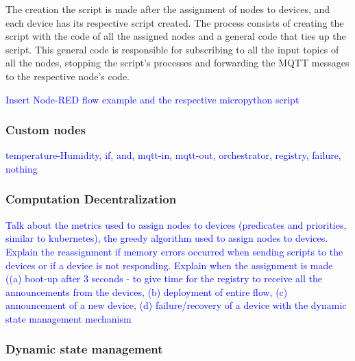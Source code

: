 The creation the script is made after the assignment of nodes to devices, and each device has its respective script created. The process consists of creating the script with the code of all the assigned nodes and a general code that ties up the script. This general code is responsible for subscribing to all the input topics of all the nodes, stopping the script's processes and forwarding the MQTT messages to the respective node's code.

\textcolor{blue}{Insert Node-RED flow example and the respective micropython script}

\subsubsection{Custom nodes}\label{sec:custom_nodes}

\textcolor{blue}{temperature-Humidity, if, and, mqtt-in, mqtt-out, orchestrator, registry, failure, nothing}

\subsubsection{Computation Decentralization}\label{sec:node_red_computation_decentralization}

\textcolor{blue}{Talk about the metrics used to assign nodes to devices (predicates and priorities, similar to kubernetes),  the greedy algorithm used to assign nodes to devices. Explain the reassignment if memory errors occurred when sending scripts to the devices or if a device is not responding. Explain when the assignment is made ((a) boot-up after 3 seconds - to give time for the registry to receive all the announcements from the devices, (b) deployment of entire flow, (c) announcement of a new device, (d) failure/recovery of a device with the dynamic state management mechanism}


    
    

\subsubsection{Dynamic state management}\label{sec:dynamic_state_management}

